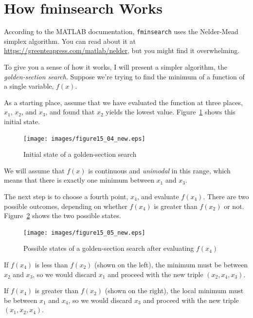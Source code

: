 \clearpage

\section{How fminsearch Works}
\label{howfminsearch}

According to the MATLAB documentation, \lstinline{fminsearch} uses the Nelder-Mead simplex algorithm.  You can read about it at \url{https://greenteapress.com/matlab/nelder}, but you might find it overwhelming.


To give you a sense of how it works, I will present a simpler algorithm, the \emph{golden-section search}.  Suppose we're trying to find the minimum of a function of a single variable, $f(x)$.

As a starting place, assume that we have evaluated the function at three places,
$x_1$, $x_2$, and $x_3$, and found that $x_2$ yields the lowest
value. Figure~\ref{fig:golden1} shows this initial state.

\begin{figure}[h]
\centerline{\texttt{[image: images/figure15\_04\_new.eps]}}
\caption{Initial state of a golden-section search}
\label{fig:golden1}
\end{figure}

We will assume that $f(x)$ is continuous and \emph{unimodal} in this range, which means that there is exactly one minimum between $x_1$ and $x_3$.


The next step is to choose a fourth point, $x_4$, and evaluate
$f(x_4)$.  There are two possible outcomes, depending on whether
$f(x_4)$ is greater than $f(x_2)$ or not.
Figure~\ref{fig:golden2} shows the two possible states.

\begin{figure}[h]
\centerline{\texttt{[image: images/figure15\_05\_new.eps]}}
\caption{Possible states of a golden-section search after evaluating $f(x_4)$}
\label{fig:golden2}
\end{figure}

If $f(x_4)$ is less than $f(x_2)$ (shown on the left), the
minimum must be between $x_2$ and $x_3$, so we would discard $x_1$ and proceed with the new triple $(x_2, x_4, x_3)$.

If $f(x_4)$ is greater than $f(x_2)$ (shown on the right), the
local minimum must be between $x_1$ and $x_4$, so we would discard $x_3$ and proceed with the new triple $(x_1, x_2, x_4)$.

